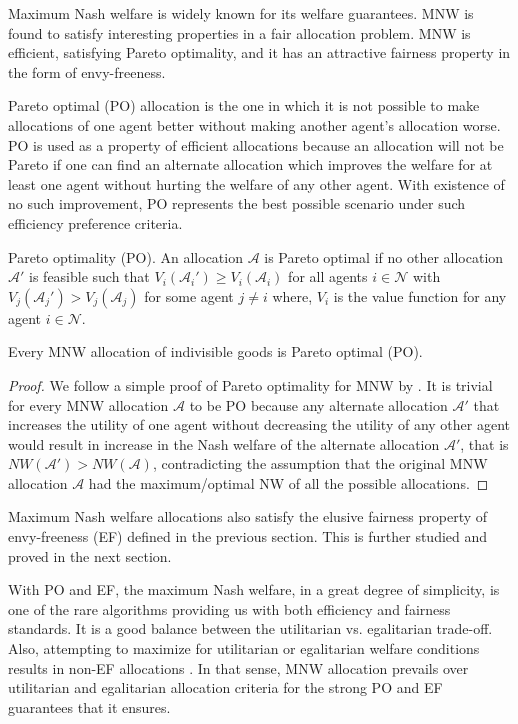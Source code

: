 Maximum Nash welfare is widely known for its welfare guarantees. MNW is found to satisfy interesting properties in a fair allocation problem. MNW is efficient, satisfying Pareto optimality, and it has an attractive fairness property in the form of envy-freeness.

Pareto optimal (PO) allocation is the one in which it is not possible to make allocations of one agent better without making another agent's allocation worse. PO is used as a property of efficient allocations because an allocation will not be Pareto if one can find an alternate allocation which improves the welfare for at least one agent without hurting the welfare of any other agent. With existence of no such improvement, PO represents the best possible scenario under such efficiency preference criteria.

\begin{definition}{Pareto optimality (PO).}
An allocation $\mathcal{A}$ is Pareto optimal if no other allocation $\mathcal{A'}$ is feasible such that $V_i(\mathcal{A}_i') \geq V_i(\mathcal{A}_i)$ for all agents $i \in \mathcal{N}$ with $ V_j(\mathcal{A}_j') > V_j(\mathcal{A}_j)$ for some agent $j \neq i$ where, $V_i$ is the value function for any agent $i \in \mathcal{N}$.
\end{definition}

\begin{theorem}
Every MNW allocation of indivisible goods is Pareto optimal (PO).
\end{theorem}

\begin{proof}
We follow a simple proof of Pareto optimality for MNW by \citet{caragiannis2016unreasonable}. It is trivial for every MNW allocation $\mathcal{A}$ to be PO because any alternate allocation $\mathcal{A}'$ that increases the utility of one agent without decreasing the utility of any other agent would result in increase in the Nash welfare of the alternate allocation $\mathcal{A}'$, that is $NW(\mathcal{A}') > NW(\mathcal{A})$, contradicting the assumption that the original MNW allocation $\mathcal{A}$ had the maximum/optimal NW of all the possible allocations. 
\end{proof}

Maximum Nash welfare allocations also satisfy the elusive fairness property of envy-freeness (EF) defined in the previous section. This is further studied and proved in the next section.

With PO and EF, the maximum Nash welfare, in a great degree of simplicity, is one of the rare algorithms providing us with both efficiency and fairness standards. It is a good balance between the utilitarian vs. egalitarian trade-off. Also, attempting to maximize for utilitarian or egalitarian welfare conditions results in non-EF allocations \cite{caragiannis2016unreasonable}. In that sense, MNW allocation prevails over utilitarian and egalitarian allocation criteria for the strong PO and EF guarantees that it ensures.

